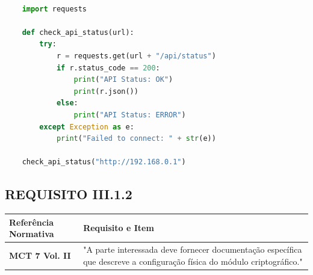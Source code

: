 \documentclass[12pt, a4paper]{article}
\begin{document}
    
    \begin{lstlisting}[language=Python, caption={Exemplo de snippet de código}]
    
    import requests
    
    def check_api_status(url):
        try:
            r = requests.get(url + "/api/status")
            if r.status_code == 200:
                print("API Status: OK")
                print(r.json())
            else:
                print("API Status: ERROR")
        except Exception as e:
            print("Failed to connect: " + str(e))
    
    check_api_status("http://192.168.0.1")
    \end{lstlisting}
    
    
    
    
    \vspace{0.5cm}
    
    
    
    \vspace{2cm} %
    
    \newpage


\subsection{REQUISITO III.1.2} 
    
    
    \begin{tabularx}{\textwidth}{l X} 
    \toprule
    
    \textbf{Referência Normativa} & \textbf{Requisito e Item} \\ 
    \midrule
    
    \rowcolor{gray!15} 
    
    \textbf{MCT 7 Vol. II} & 
    "A parte interessada deve fornecer documentação específica que descreve a configuração física do módulo criptográfico." \\
    \bottomrule
    \end{tabularx}
    
    \vspace{1cm} 
    
\end{document}

